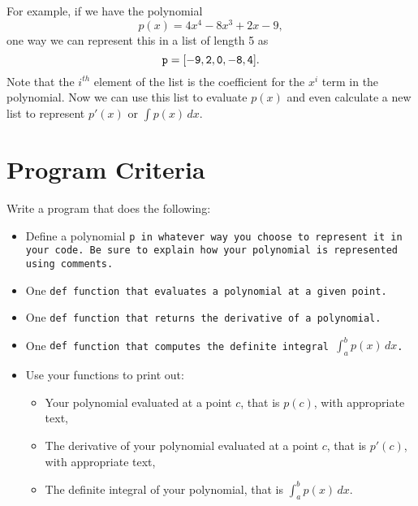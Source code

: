 \documentclass{article}
\def\prog#1{
\vspace{.1in}\begin{mdframed} \begin{center} \textbf{Programming Reminders} \end{center}#1 \end{mdframed} }
\begin{document}
	For example, if we have the  polynomial
	\[ p(x) = 4x^4 - 8x^3 + 2x - 9,\]
	one way we can represent this in a list of length 5 as $$\tt{p = [-9, 2, 0, -8, 4]}.$$  Note that the $i^{th}$ element of the list is the coefficient for the $x^i$ term in the polynomial.  Now we can use this list to evaluate $p(x)$ and even calculate a new list to represent $p'(x)$ or $\int p(x)\,dx$. 
	
	
 
 	
 	
 	
 	
 	
 	
 	

	
	
	
	
	
	
	
	




\section*{Program Criteria}
	Write a program that does the following:
	\begin{itemize}
		\item Define a polynomial \tt{p} in whatever way you choose to represent it in your code.  Be sure to explain how your polynomial is represented  using comments.
		\item One \tt{def} function  that evaluates a polynomial at a given point.
		\item One \tt{def} function that returns the derivative of a polynomial.
		\item One \tt{def} function that computes the definite integral $\int_a^b p(x) \,dx$.
		\item Use your functions to print out:
		\begin{itemize}
			\item Your polynomial evaluated at a point $c$, that is $p(c)$, with appropriate text,
			\item The derivative of your polynomial evaluated at a point $c$, that is $p'(c)$, with appropriate text,
			\item The definite integral of your polynomial, that is $\int_a^b p(x) \,dx$.
		\end{itemize}
	\end{itemize}
\end{document}
